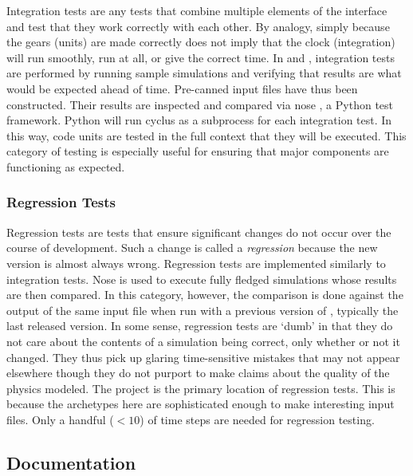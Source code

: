 Integration tests are any tests that combine multiple elements of the 
\Cyclus interface and test that they work correctly with each other.  By analogy, 
simply because the gears (units) are made correctly does not imply that the 
clock (integration) will run smoothly, run at all, or give the correct time.
In \Cyclus and \Cycamore, integration tests are performed by running sample
simulations and verifying that results are what would be expected ahead of 
time. Pre-canned input files have thus been constructed. Their results 
are inspected and compared via nose \cite{pellerin_nose_2007}, a Python test framework.
Python will run cyclus as a subprocess for each integration test. In this
way, \Cyclus code units are tested in the full context that they will be
executed. This category of testing is especially useful for ensuring that 
major \Cyclus components are functioning as expected.

\subsubsection{Regression Tests}

Regression tests are tests that ensure significant changes do not 
occur over the course of \Cyclus development. Such a change is called a 
\emph{regression} because the new version is almost always wrong.
Regression tests are implemented similarly to integration tests.
Nose is used to execute fully fledged \Cyclus simulations whose results
are then compared. In this category, however, the comparison is done against 
the output of the same input file when run with a previous version of \Cyclus, 
typically the last released version.
In some sense, regression tests are `dumb' in that they do 
not care about the contents of a simulation being correct, only whether or not 
it changed. They thus pick up glaring time-sensitive mistakes that may 
not appear elsewhere though they do not purport to make claims about the
quality of the physics modeled. The \Cycamore project is the primary location of
regression tests. This is because the archetypes here are sophisticated enough
to make interesting input files. Only a handful ($<10$) of time steps are needed 
for regression testing.

\subsection{Documentation}

